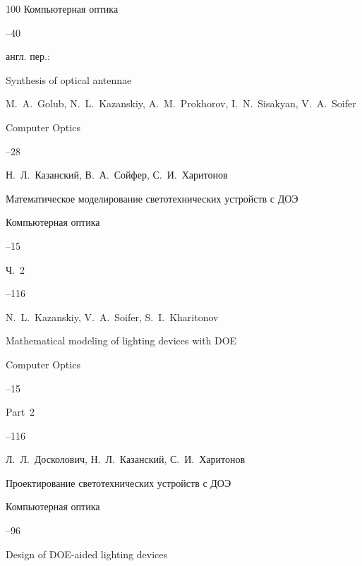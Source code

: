 \begin{thebibliography}{100}
\jour Компьютерная оптика



--40

\transl англ. пер.:~

\paper Synthesis of optical antennae

\by M.~A.~Golub, N.~L.~Kazanskiy, A.~M.~Prokhorov, I.~N.~Sisakyan, V.~A.~Soifer

\jour Computer Optics




--28






\by Н.~Л.~Казанский, В.~А.~Сойфер, С.~И.~Харитонов

\paper Математическое моделирование светотехнических устройств с ДОЭ

\jour Компьютерная оптика


--15

\issueinfo Ч.~2

--116

\misctransl

\by N.~L.~Kazanskiy, V.~A.~Soifer, S.~I.~Kharitonov

\paper Mathematical modeling of lighting devices with DOE

\jour Computer Optics


--15

\issueinfo Part~2

--116






\by  Л.~Л.~Досколович, Н.~Л.~Казанский, С.~И.~Харитонов

\paper Проектирование светотехнических устройств с ДОЭ

\jour Компьютерная оптика



--96

\misctransl

\paper Design of DOE-aided lighting devices 


\end{thebibliography}
